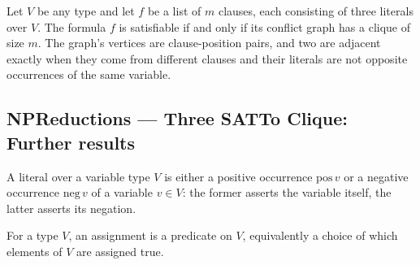 \begin{theorem}
\label{ThreeSATToClique.ThreeSAT_to_Clique_equivalence}
\leanok
{}
Let $V$ be any type and let $f$ be a list of $m$ clauses, each consisting of three
literals over $V$. The formula $f$ is satisfiable if and only if its conflict graph has
a clique of size $m$. The graph's vertices are clause-position pairs, and two are
adjacent exactly when they come from different clauses and their literals are not
opposite occurrences of the same variable.
\end{theorem}

\subsection*{NPReductions --- Three SATTo Clique: Further results}

\begin{definition}[Literal]
\label{ThreeSATToClique.Literal}
\leanok
A literal over a variable type $V$ is either a positive occurrence
$\mathrm{pos}\,v$ or a negative occurrence $\mathrm{neg}\,v$ of a variable
$v \in V$: the former asserts the variable itself, the latter asserts its
negation.
\end{definition}

\begin{definition}
\label{ThreeSATToClique.Assignment}
\leanok
For a type $V$, an assignment is a predicate on $V$, equivalently a choice of which
elements of $V$ are assigned true.
\end{definition}
